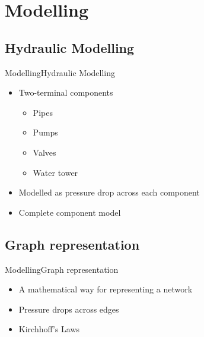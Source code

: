 \section{Modelling}
\subsection{Hydraulic Modelling}

\begin{frame}{Modelling}{Hydraulic Modelling}
\begin{itemize}
	\item<1-> Two-terminal components 
	\begin{itemize}
		\item<1-> Pipes 
		\item<1-> Pumps
		\item<1-> Valves
		\item<1-> Water tower
	\end{itemize}
	\item<1-> Modelled as pressure drop across each component
\end{itemize}

	\begin{itemize}
		\item<2-> Complete component model
	\end{itemize}

\end{frame}

\subsection{Graph representation}

\begin{frame}{Modelling}{Graph representation}
\begin{itemize}
	\item<1-> A mathematical way for representing a network
	\item<1-> Pressure drops across edges
	\item<1-> Kirchhoff's Laws 
\end{itemize}
\vspace{-0.5cm}

\end{frame}



